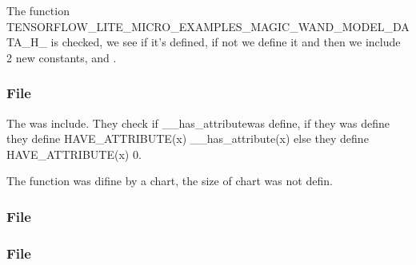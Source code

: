 \subsubsection{}



The function  TENSORFLOW\_LITE\_MICRO\_EXAMPLES\_MAGIC\_WAND\_MODEL\_DATA\_H\_ is checked, we see if it's defined, if not we define it and then we include 2 new constants,  and .


\begin{center}
    		
    \label{Code:Magic Wand model data}
\end{center}


\subsubsection{File }

The  was include. They check if \_\_has\_attributewas define, if they was define they define HAVE\_ATTRIBUTE(x) \_\_has\_attribute(x) else they define HAVE\_ATTRIBUTE(x) 0. 

The function  was difine by a chart, the size of chart was not defin.

\begin{center}
    \label{Magic Wand model data}
\end{center}

\subsubsection{File }

\begin{center}
    \label{Magic Wand main function}
\end{center}

\subsubsection{File }

